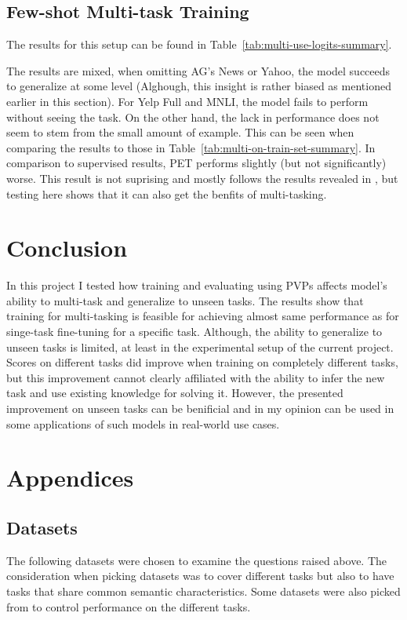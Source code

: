 \documentclass[11pt,a4paper]{article}
\begin{document}

\subsection*{Few-shot Multi-task Training}
The results for this setup can be found in Table~\ref{tab:multi-use-logits-summary}.

The results are mixed, when omitting AG's News or Yahoo, the model succeeds to generalize at some level (Alghough, this insight is rather biased as mentioned earlier in this section).
For Yelp Full and MNLI, the model fails to perform without seeing the task.
On the other hand, the lack in performance does not seem to stem from the small amount of example.
This can be seen when comparing the results to those in Table~\ref{tab:multi-on-train-set-summary}.
In comparison to supervised results, PET performs slightly (but not significantly) worse.
This result is not suprising and mostly follows the results revealed in \citet{schick2020exploiting}, but testing here shows that it can also get the benfits of multi-tasking.

\section{Conclusion}
In this project I tested how training and evaluating using PVPs affects model's ability to multi-task and generalize to unseen tasks.
The results show that training for multi-tasking is feasible for achieving almost same performance as for singe-task fine-tuning for a specific task.
Although, the ability to generalize to unseen tasks is limited, at least in the experimental setup of the current project.
Scores on different tasks did improve when training on completely different tasks, but this improvement cannot clearly affiliated with the ability to infer the new task and use existing knowledge for solving it. 
However, the presented improvement on unseen tasks can be benificial and in my opinion can be used in some applications of such models in real-world use cases. 




\newpage
\appendix


\section{Appendices}
\label{sec:appendix}

\subsection{Datasets}
\label{apx:datasets}
The following datasets were chosen to examine the questions raised above.
The consideration when picking datasets was to cover different tasks but also to have tasks that share common semantic characteristics. 
Some datasets were also picked from \citet{schick2020exploiting} to control performance on the different tasks.
\end{document}
